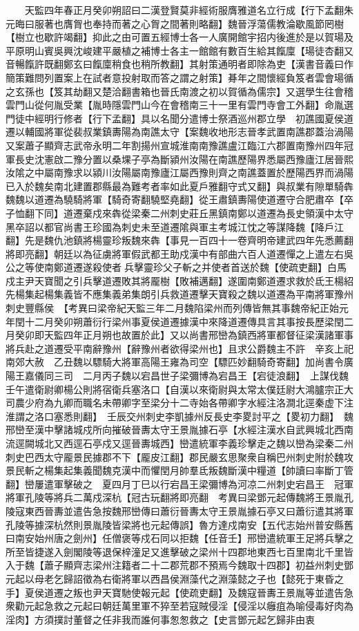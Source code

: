 　　天監四年春正月癸卯朔詔曰二漢登賢莫非經術服膺雅道名立行成【行下孟翻朱元晦曰服著也膺胷也奉持而著之心胷之間著則略翻】魏晉浮蕩儒教淪歇風節罔樹【樹立也歇許竭翻】抑此之由可置五經博士各一人廣開館宇招内後進於是以賀瑒及平原明山賓吳興沈峻建平嚴植之補博士各主一館館有數百生給其餼廩【瑒徒杏翻又音暢餼許既翻鄭玄曰餼廩稍食也稍所教翻】其射策通明者即除為吏【漢書音義曰作簡策難問列置案上在試者意投射取而答之謂之射策】朞年之間懷經負笈者雲會瑒循之玄孫也【笈其劫翻又楚洽翻書箱也晉氏南渡之初以賀循為儒宗】又選學生往會稽雲門山從何胤受業【胤時隱雲門山今在會稽南三十一里有雲門寺會工外翻】命胤選門徒中經明行修者【行下孟翻】具以名聞分遣博士祭酒巡州郡立學　初譙國夏侯道遷以輔國將軍從裴叔業鎮夀陽為南譙太守【案魏收地形志晉孝武置南譙郡蓋治渦陽又案蕭子顯齊志武帝永明二年割揚州宣城淮南南豫譙盧江臨江六郡置南豫州四年冠軍長史沈憲啟二豫分置以桑堁子亭為斷潁州汝陽在南譙歷陽界悉屬西豫廬江居晉熙汝隂之中屬南豫求以潁川汝陽屬南豫廬江屬西豫則齊之南譙蓋置於歷陽西界而渦陽已入於魏矣南北建置郡縣最為難考者率如此夏戶雅翻守式又翻】與叔業有隙單騎犇魏魏以道遷為驍騎將軍【騎奇寄翻驍堅堯翻】從王肅鎮夀陽使道遷守合肥肅卒【卒子恤翻下同】道遷棄戍來犇從梁秦二州刺史莊丘黑鎮南鄭以道遷為長史領漢中太守黑卒詔以都官尚書王珍國為刺史未至道遷隂與軍主考城江忱之等謀降魏【降戶江翻】先是魏仇池鎮將楊靈珍叛魏來犇【事見一百四十一卷齊明帝建武四年先悉薦翻將即亮翻】朝廷以為征虜將軍假武都王助戍漢中有部曲六百人道遷憚之上遣左右吳公之等使南鄭道遷遂殺使者兵擊靈珍父子斬之并使者首送於魏【使疏吏翻】白馬戍主尹天寶聞之引兵擊道遷敗其將龎樹【敗補邁翻】遂圍南鄭道遷求救於氐王楊紹先楊集起楊集義皆不應集義弟集朗引兵救道遷擊天寶殺之魏以道遷為平南將軍豫州刺史豐縣侯　【考異曰梁帝紀天監三年二月魏陷梁州而列傳皆無其事魏帝紀正始元年閏十二月癸卯朔蕭衍行梁州事夏侯道遷據漢中來降道遷傳具言其事按長歷梁閏二月癸卯即天監四年正月朔也故置於此】又以尚書邢巒為鎮西將軍都督征梁漢諸軍事將兵赴之道遷受平南辭豫州【辭豫州者欲得梁州也】且求公爵魏主不許　辛亥上祀南郊大赦　乙丑魏以驃騎大將軍高陽王雍為司空【驃匹妙翻騎奇寄翻】加尚書令廣陽王嘉儀同三司　二月丙子魏以宕昌世子梁彌博為宕昌王【宕徒浪翻】　上謀伐魏壬午遣衛尉卿楊公則將宿衛兵塞洛口【自漢以來衛尉與太常太僕廷尉大鴻臚宗正大司農少府為九卿而職名未帶卿字至梁分十二寺始各帶卿字水經注洛澗北逕秦虚下注淮謂之洛口塞悉則翻】　壬辰交州刺史李凱據州反長史李畟討平之【畟初力翻】　魏邢巒至漢中擊諸城戍所向摧破晉夀太守王景胤據石亭【水經注漢水自武興城北西南流逕闕城北又西逕石亭戍又逕晉夀城西】巒遣統軍李義珍擊走之魏以巒為梁秦二州刺史巴西太守龎景民據郡不下【龎皮江翻】郡民嚴玄思聚衆自稱巴州刺史附於魏攻景民斬之楊集起集義聞魏克漢中而懼閏月帥羣氐叛魏斷漢中糧道【帥讀曰率斷丁管翻】巒屢遣軍擊破之　夏四月丁巳以行宕昌王梁彌博為河凉二州刺史宕昌王　冠軍將軍孔陵等將兵二萬戍深杭【冠古玩翻將即亮翻　考異曰梁鄧元起傳魏將王景胤孔陵寇東西晉夀並遣告急按魏邢巒傳曰蕭衍晉夀太守王景胤據石亭又曰蕭衍遣其將軍孔陵等據深杭然則景胤陵皆梁將也元起傳誤】魯方達戍南安【五代志始州普安縣舊曰南安始州唐之劍州】任僧褒等戍石同以拒魏【任音壬】邢巒遣統軍王足將兵擊之所至皆捷遂入劍閣陵等退保梓潼足又進擊破之梁州十四郡地東西七百里南北千里皆入于魏【蕭子顯齊志梁州注籍者二十二郡荒郡不預焉今魏取十四郡】初益州刺史鄧元起以母老乞歸詔徵為右衛將軍以西昌侯淵藻代之淵藻懿之子也【懿死于東昏之手】夏侯道遷之叛也尹天寶馳使報元起【使疏吏翻】及魏寇晉夀王景胤等並遣告急衆勸元起急救之元起曰朝廷萬里軍不猝至若寇賊侵淫【侵淫以癰疽為喻侵毒好肉為淫肉】方須撲討董督之任非我而誰何事怱怱救之【史言鄧元起乞歸非由衷